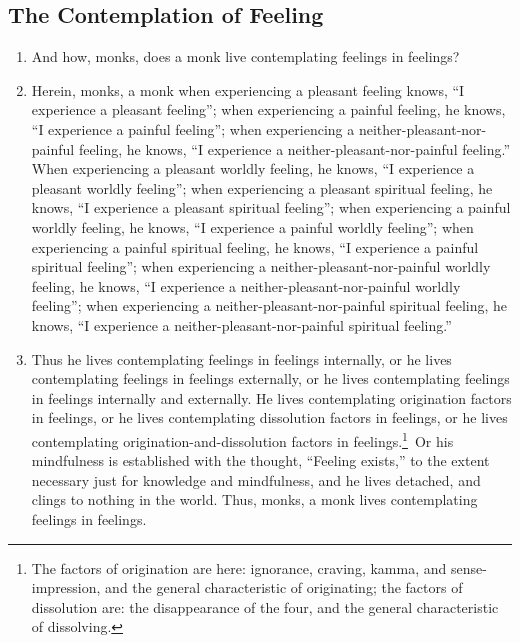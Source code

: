 \documentclass[a4 paper, 12pt]{article}
\begin{document}
\begin{multicols}{2}
\subsection*{The Contemplation of Feeling}
\begin{enumerate}[resume]
\item And how, monks, does a monk live contemplating feelings in feelings?
\item Herein, monks, a monk when experiencing a pleasant feeling knows, “I experience a pleasant feeling”; when experiencing a painful feeling, he knows, “I experience a painful feeling”; when experiencing a neither-pleasant-nor-painful feeling, he knows, “I experience a neither-pleasant-nor-painful feeling.” When experiencing a pleasant worldly feeling, he knows, “I experience a pleasant worldly feeling”; when experiencing a pleasant spiritual feeling, he knows, “I experience a pleasant spiritual feeling”; when experiencing a painful worldly feeling, he knows, “I experience a painful worldly feeling”; when experiencing a painful spiritual feeling, he knows, “I experience a painful spiritual feeling”; when experiencing a neither-pleasant-nor-painful worldly feeling, he knows, “I experience a neither-pleasant-nor-painful worldly feeling”; when experiencing a neither-pleasant-nor-painful spiritual feeling, he knows, “I experience a neither-pleasant-nor-painful spiritual feeling.”
\item Thus he lives contemplating feelings in feelings internally, or he lives contemplating feelings in feelings externally, or he lives contemplating feelings in feelings internally and externally. He lives contemplating origination factors in feelings, or he lives contemplating dissolution factors in feelings, or he lives contemplating origination-and-dissolution factors in feelings.\footnote{The factors of origination are here: ignorance, craving, kamma, and sense-impression, and the general characteristic of originating; the factors of dissolution are: the disappearance of the four, and the general characteristic of dissolving.} Or his mindfulness is established with the thought, “Feeling exists,” to the extent necessary just for knowledge and mindfulness, and he lives detached, and clings to nothing in the world. Thus, monks, a monk lives contemplating feelings in feelings.
\end{enumerate}

\end{multicols}
\end{document}
